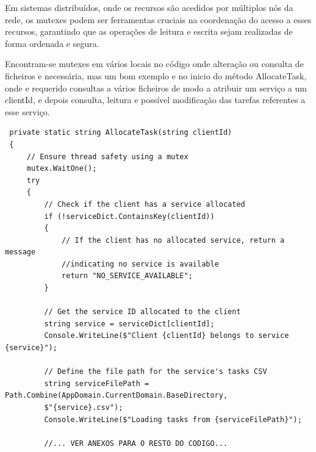 \documentclass[12pt]{article}
\begin{document}
\noindent Em sistemas distribuídos, onde os recursos são acedidos por múltiplos nós da rede, os mutexes podem ser ferramentas cruciais na coordenação do acesso a esses recursos, garantindo que as operações de leitura e escrita sejam realizadas de forma ordenada e segura.

\noindent Encontram-se mutexes em vários locais no código onde alteração ou consulta de ficheiros e necessária, mas um bom exemplo e no inicio do método AllocateTask, onde e requerido consultas a vários ficheiros de modo a atribuir um serviço a um clientId, e depois consulta, leitura e possível modificação das tarefas referentes a esse serviço.
\begin{verbatim}
 private static string AllocateTask(string clientId)
 {
     // Ensure thread safety using a mutex
     mutex.WaitOne();
     try
     {
         // Check if the client has a service allocated
         if (!serviceDict.ContainsKey(clientId))
         {
             // If the client has no allocated service, return a message
             //indicating no service is available
             return "NO_SERVICE_AVAILABLE";
         }

         // Get the service ID allocated to the client
         string service = serviceDict[clientId];
         Console.WriteLine($"Client {clientId} belongs to service {service}");

         // Define the file path for the service's tasks CSV
         string serviceFilePath = Path.Combine(AppDomain.CurrentDomain.BaseDirectory, 
         $"{service}.csv");
         Console.WriteLine($"Loading tasks from {serviceFilePath}");
         
         //... VER ANEXOS PARA O RESTO DO CODIGO...
         
\end{verbatim}
\end{document}
